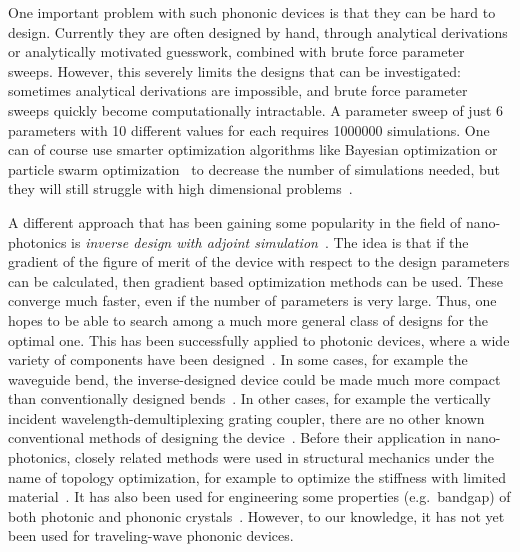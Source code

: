 One important problem with such phononic devices is that they can be hard to design.
Currently they are often designed by hand,
through analytical derivations or analytically motivated guesswork,
combined with brute force parameter sweeps.
However, this severely limits the designs that can be investigated:
sometimes analytical derivations are impossible, and brute force parameter
sweeps quickly become computationally intractable.
A parameter sweep of just 6 parameters with 10 different values for each
requires \num{1000000} simulations.
One can of course use smarter optimization algorithms like Bayesian optimization
or particle swarm optimization~\cite{schneider2019benchmarking,zhang_compact_2013}
to decrease the number of simulations needed,
but they will still struggle with high dimensional
problems~\cite{chen_measuring_2015}.

A different approach that has been gaining some popularity in the field of
nano-photonics is \emph{inverse design with adjoint
simulation}~\cite{molesky_inverse_2018}.
The idea is that if the gradient of the figure of merit of the device
with respect to the design parameters can be calculated, then gradient based
optimization methods can be used.
These converge much faster, even if the number of
parameters is very large. Thus, one hopes to be able to search
among a much more general class of designs for the optimal one.
This has been successfully applied to photonic devices,
where a wide variety of components have been designed~\cite{spins2019}.
In some cases, for example the waveguide bend, the inverse-designed device could
be made much more compact than conventionally designed
bends~\cite{jensen_systematic_2004}.
In other cases, for example the vertically incident wavelength-demultiplexing
grating coupler, there are no other known conventional methods of designing the
device~\cite{piggott_inverse_2014}.
Before their application in nano-photonics, closely related methods were used in
structural mechanics under the name of topology
optimization, for example to optimize the stiffness with limited material~\cite{sigmund_topology_2013}.
It has also been used for engineering some properties (e.g.\ bandgap) of
both photonic and phononic crystals~\cite{yi_comprehensive_2016}.
However, to our knowledge, it has not yet been used for traveling-wave phononic devices.

